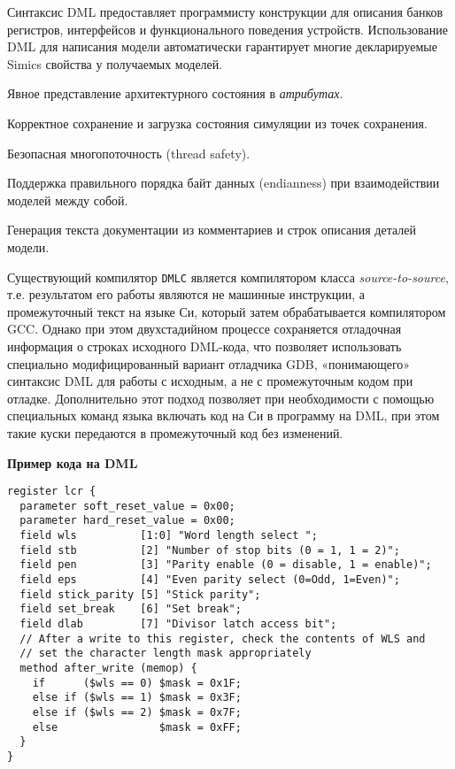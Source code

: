 Синтаксис DML предоставляет программисту конструкции для описания банков регистров, интерфейсов и функционального поведения устройств. Использование DML для написания модели автоматически гарантирует многие декларируемые Simics свойства у получаемых моделей.

\begin{itemize*}
\item Явное представление архитектурного состояния в \textit{атрибутах}.
\item Корректное сохранение и загрузка состояния симуляции из точек сохранения.
\item Безопасная многопоточность (\abbr thread safety).
\item Поддержка правильного порядка байт данных (\abbr endianness) при взаимодействии моделей между собой.
\item Генерация текста документации из комментариев и строк описания деталей модели.
\end{itemize*}

Существующий компилятор \texttt{DMLC} является компилятором класса \textit{source-to-source}, т.е. результатом его работы являются не машинные инструкции, а промежуточный текст на языке Си, который затем обрабатывается компилятором GCC. Однако при этом двухстадийном процессе сохраняется отладочная информация о строках исходного DML-кода, что позволяет использовать специально модифицированный вариант отладчика GDB, «понимающего» синтаксис DML для работы с исходным, а не с промежуточным кодом при отладке. Дополнительно этот подход позволяет при необходимости с помощью специальных команд языка включать код на Си в программу на DML, при этом такие куски передаются в промежуточный код без изменений.

\textbf{Пример кода на DML} %

\begin{lstlisting}
register lcr { 
  parameter soft_reset_value = 0x00; 
  parameter hard_reset_value = 0x00; 
  field wls          [1:0] "Word length select "; 
  field stb          [2] "Number of stop bits (0 = 1, 1 = 2)"; 
  field pen          [3] "Parity enable (0 = disable, 1 = enable)"; 
  field eps          [4] "Even parity select (0=Odd, 1=Even)"; 
  field stick_parity [5] "Stick parity"; 
  field set_break    [6] "Set break"; 
  field dlab         [7] "Divisor latch access bit"; 
  // After a write to this register, check the contents of WLS and  
  // set the character length mask appropriately 
  method after_write (memop) { 
    if      ($wls == 0) $mask = 0x1F; 
    else if ($wls == 1) $mask = 0x3F; 
    else if ($wls == 2) $mask = 0x7F; 
    else                $mask = 0xFF; 
  } 
}   
\end{lstlisting} 


